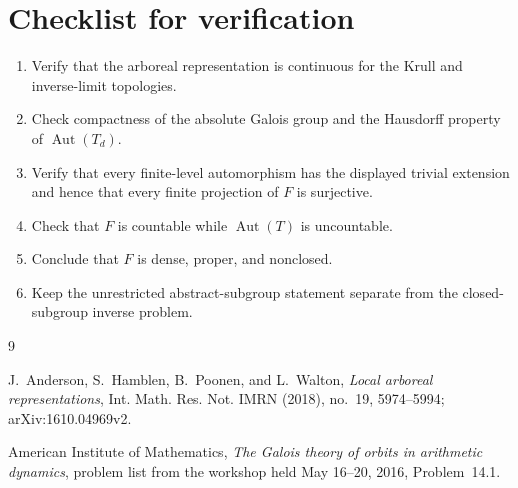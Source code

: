 \documentclass[10pt,reqno]{amsart}
\theoremstyle{definition}
\begin{document}
\appendix

\section{Checklist for verification}

\begin{enumerate}
  \item Verify that the arboreal representation is continuous for the Krull
  and inverse-limit topologies.
  \item Check compactness of the absolute Galois group and the Hausdorff
  property of \(\operatorname{Aut}(T_d)\).
  \item Verify that every finite-level automorphism has the displayed trivial
  extension and hence that every finite projection of \(F\) is surjective.
  \item Check that \(F\) is countable while \(\operatorname{Aut}(T)\) is
  uncountable.
  \item Conclude that \(F\) is dense, proper, and nonclosed.
  \item Keep the unrestricted abstract-subgroup statement separate from the
  closed-subgroup inverse problem.
\end{enumerate}

\begin{thebibliography}{9}

J.~Anderson, S.~Hamblen, B.~Poonen, and L.~Walton,
\emph{Local arboreal representations},
Int. Math. Res. Not. IMRN (2018), no.~19, 5974--5994;
arXiv:1610.04969v2.

American Institute of Mathematics,
\emph{The Galois theory of orbits in arithmetic dynamics},
problem list from the workshop held May 16--20, 2016, Problem~14.1.

\end{thebibliography}
\end{document}
